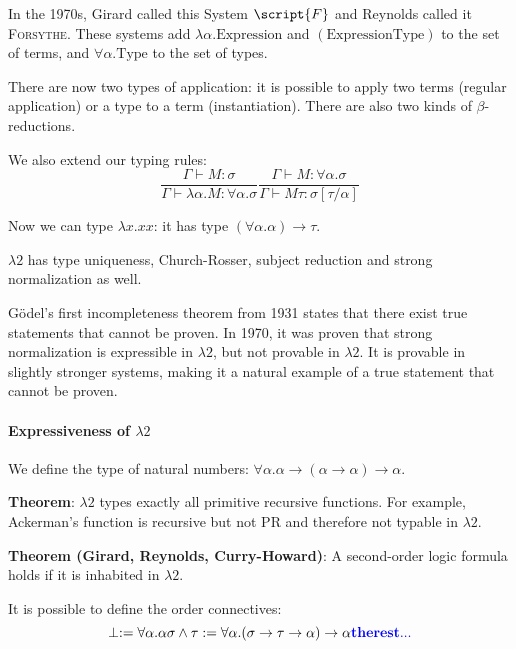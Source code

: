In the 1970s, Girard called this System $\script{F}$ and Reynolds called it \textsc{Forsythe}.
These systems add $\lambda \alpha. \mathrm{Expression}$ and $(\mathrm{Expression} \mathrm{Type})$ to the set
of terms, and $\forall \alpha. \mathrm{Type}$ to the set of types.

There are now two types of application: it is possible to apply two terms (regular application)
or a type to a term (instantiation). There are also two kinds of $\beta$-reductions.

We also extend our typing rules:
\[
\frac{\Gamma \vdash M : \sigma}{\Gamma \vdash \lambda \alpha. M : \forall \alpha. \sigma}

\frac{\Gamma \vdash M : \forall \alpha. \sigma}{\Gamma \vdash M \tau : \sigma[\tau/\alpha]}
\]

Now we can type $\lambda x. x x$: it has type $(\forall \alpha. \alpha) \to \tau$.

$\lambda2$ has type uniqueness, Church-Rosser, subject reduction and strong normalization as well.

G\"odel's first incompleteness theorem from 1931 states that there exist true statements that cannot be proven.
In 1970, it was proven that strong normalization is expressible in $\lambda2$, but not provable in $\lambda2$.
It is provable in slightly stronger systems, making it a natural example of a true statement that cannot be proven.

\paragraph{Expressiveness of $\lambda2$}
We define the type of natural numbers: $\forall \alpha. \alpha \to (\alpha \to \alpha) \to \alpha$.


\textbf{Theorem}: $\lambda2$ types exactly all primitive recursive functions. For example, Ackerman's function is
recursive but not PR and therefore not typable in $\lambda2$.

\textbf{Theorem (Girard, Reynolds, Curry-Howard)}: A second-order logic formula holds if it is inhabited in $\lambda 2$.

It is possible to define the order connectives:
\[
\perp := \forall \alpha. \alpha
\sigma \wedge \tau := \forall \alpha. (\sigma \to \tau \to \alpha) \to \alpha
{\color{blue} \bf the rest...}
\]


